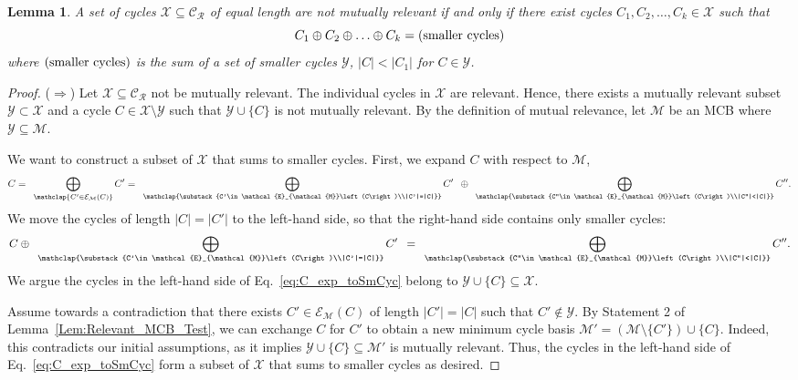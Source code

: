 \documentclass[fleqn,11pt]{article}
\newtheorem{lemma}[theorem]{Lemma}
\newcommand\calM{\mathcal{M}}
\newcommand\calX{\mathcal{X}}     %
\newcommand\calY{\mathcal{Y}}
\newcommand\RelCyc{\mathcal{C_R}} %
\newcommand\expand[2]{\mathcal{E}_{#1}\left(#2\right)}   %
\newcommand\smCyc{\textnormal{(smaller cycles)}}
\begin{document}
\begin{lemma}
	A set of cycles $\calX\subseteq\RelCyc$ of equal length are not mutually relevant if and only if there exist cycles $C_1,C_2,\hdots,C_k\in\calX$ such that
	\begin{equation}
		C_1\oplus C_2 \oplus\hdots\oplus C_k = \smCyc
		\label{eq:mut_rel_ind}
	\end{equation}
	where $\smCyc$ is the sum of a set of smaller cycles $\calY$, $|C|<|C_1|$ for $C\in\calY$.
	\label{Lem:mut_rel_2}
\end{lemma}
\begin{proof}
	($\Rightarrow$) Let $\calX\subseteq\RelCyc$ not be mutually relevant. The individual cycles in $\calX$ are relevant. Hence, there exists a mutually relevant subset $\calY\subset\calX$ and a cycle $C\in\calX\setminus\calY$ such that $\calY\cup\{C\}$ is not mutually relevant. By the definition of mutual relevance, let $\calM$ be an MCB where $\calY\subseteq\calM$.
	
	We want to construct a subset of $\calX$ that sums to smaller cycles. First, we expand $C$ with respect to $\calM$,
	\begin{equation}
		C = \enspace\bigoplus_{\mathclap{C'\in\expand{\calM}{C}}} C' = \enspace\bigoplus_{\mathclap{\substack{C'\in\expand{\calM}{C}\\|C'|=|C|}}} C' \enspace\oplus\enspace \bigoplus_{\mathclap{\substack{C''\in\expand{\calM}{C}\\|C''|<|C|}}}C''.
	\end{equation}
	We move the cycles of length $|C|=|C'|$ to the left-hand side, so that the right-hand side contains only smaller cycles:
	\begin{equation}
		C\oplus\enspace\bigoplus_{\mathclap{\substack{C'\in\expand{\calM}{C}\\|C'|=|C|}}}C'\enspace =  \enspace\bigoplus_{\mathclap{\substack{C''\in\expand{\calM}{C}\\|C''|<|C|}}}C''. %
		\label{eq:C_exp_toSmCyc}
	\end{equation}
	We argue the cycles in the left-hand side of Eq.~\eqref{eq:C_exp_toSmCyc} belong to $\calY\cup\{C\}\subseteq\calX$.
	
	Assume towards a contradiction that there exists $C'\in\expand{\calM}{C}$ of length $|C'|=|C|$ such that $C'\notin\calY$. 
	By Statement 2 of Lemma~\ref{Lem:Relevant_MCB_Test}, we can exchange $C$ for $C'$ to obtain a new minimum cycle basis $\calM'=(\calM\setminus\{C'\})\cup\{C\}$.
	Indeed, this contradicts our initial assumptions, as it implies $\calY\cup\{C\}\subseteq\calM'$ is mutually relevant.
	Thus, the cycles in the left-hand side of Eq.~\eqref{eq:C_exp_toSmCyc} form a subset of $\calX$ that sums to smaller cycles as desired.
	

\end{proof}
\end{document}
